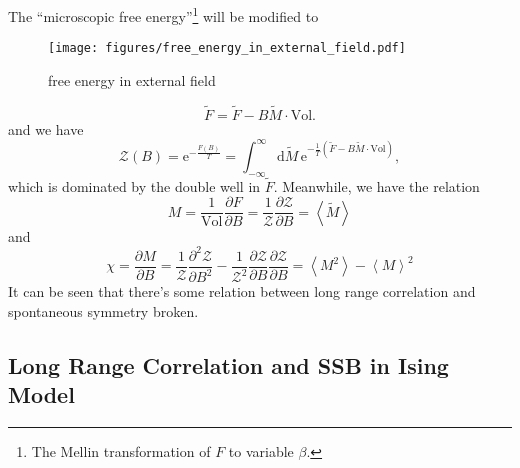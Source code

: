
The ``microscopic free energy''\footnote{The Mellin transformation of $F$ to variable $\beta$.} will be modified to
\begin{figure}[h]
    \centering
    \texttt{[image: figures/free\_energy\_in\_external\_field.pdf]}
    \caption{free energy in external field}
\end{figure}
\begin{equation}
  \tilde{F} = \tilde{F} - B \tilde{M} \cdot \text{Vol}.
\end{equation}
and we have 
\begin{equation}
    \mathcal{Z}\left( B \right)  = \mathrm{e}^{- \frac{F\left( B \right)}{T}} = \int_{-\infty}^{\infty} \mathrm{d}\tilde{M} \, \mathrm{e}^{-\frac{1}{T} \left( \tilde{F} - B \tilde{M} \cdot \text{Vol} \right) } ,
\end{equation}
which is dominated by the double well in $\tilde{F}$.
Meanwhile, we have the relation
\begin{equation}
    M = \frac{1}{\text{Vol}} \frac{\partial F}{\partial B} = \frac{1}{\mathcal{Z}} \frac{\partial \mathcal{Z}}{\partial B} = \left< \tilde{M} \right> 
\end{equation}
and
\begin{equation}
  \chi = \frac{\partial M}{\partial B} = \frac{1}{\mathcal{Z}} \frac{\partial^2 \mathcal{Z}}{\partial B^2} - \frac{1}{\mathcal{Z}^{2}} \frac{\partial \mathcal{Z}}{\partial B} \frac{\partial \mathcal{Z}}{\partial B} = \left< M^{2} \right> - \left< M \right>^{2}
\end{equation}
It can be seen that there's some relation between long range correlation and spontaneous symmetry broken.

\subsection{Long Range Correlation and SSB in Ising Model}

